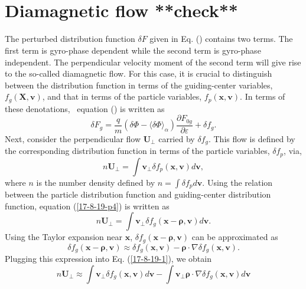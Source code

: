 \documentclass{llncs}
\newcommand{\tmmathbf}[1]{\ensuremath{\boldsymbol{#1}}}
\begin{document}
\

\

\section{Diamagnetic flow **check**}\label{17-9-26-1}\label{17-8-19-e1}

The perturbed distribution function $\delta F$ given in Eq. () contains two
terms. The first term is gyro-phase dependent while the second term is
gyro-phase independent. The perpendicular velocity moment of the second term
will give rise to the so-called diamagnetic flow. For this case, it is crucial
to distinguish between the distribution function in terms of the
guiding-center variables, $f_g (\mathbf{X}, \mathbf{v})$, and that in terms of
the particle variables, $f_p (\mathbf{x}, \mathbf{v})$. In terms of these
denotations, \ equation () is written as
\begin{equation}
  \delta F_g = \frac{q}{m} (\delta \Phi - \langle \delta \Phi
  \rangle_{\alpha}) \frac{\partial F_{0 g}}{\partial \varepsilon} + \delta f_g
  .
\end{equation}
Next, consider the perpendicular flow $\mathbf{U}_{\perp}$ carried by $\delta
f_g$. This flow is defined by the corresponding distribution function in terms
of the particle variables, $\delta f_p$, via,
\begin{equation}
  \label{17-8-19-p4} n\mathbf{U}_{\perp} = \int \mathbf{v}_{\perp} \delta f_p
  (\mathbf{x}, \mathbf{v}) d\mathbf{v},
\end{equation}
where $n$ is the number density defined by $n = \int \delta f_p d\mathbf{v}$.
Using the relation between the particle distribution function and
guiding-center distribution function, equation (\ref{17-8-19-p4}) is written
as
\begin{equation}
  \label{17-8-19-1} n\mathbf{U}_{\perp} = \int \mathbf{v}_{\perp} \delta f_g
  (\mathbf{x}-\tmmathbf{\rho}, \mathbf{v}) d\mathbf{v}.
\end{equation}
Using the Taylor expansion near $\mathbf{x}$, $\delta f_g
(\mathbf{x}-\tmmathbf{\rho}, \mathbf{v})$ can be approximated as
\begin{equation}
  \delta f_g (\mathbf{x}-\tmmathbf{\rho}, \mathbf{v}) \approx \delta f_g
  (\mathbf{x}, \mathbf{v}) -\tmmathbf{\rho} \cdot \nabla \delta f_g
  (\mathbf{x}, \mathbf{v}) .
\end{equation}
Plugging this expression into Eq. (\ref{17-8-19-1}), we obtain
\begin{equation}
  \label{17-8-19-3} n\mathbf{U}_{\perp} \approx \int \mathbf{v}_{\perp} \delta
  f_g (\mathbf{x}, \mathbf{v}) d\mathbf{v}- \int \mathbf{v}_{\perp}
  \tmmathbf{\rho} \cdot \nabla \delta f_g (\mathbf{x}, \mathbf{v}) d\mathbf{v}
\end{equation}
\end{document}
